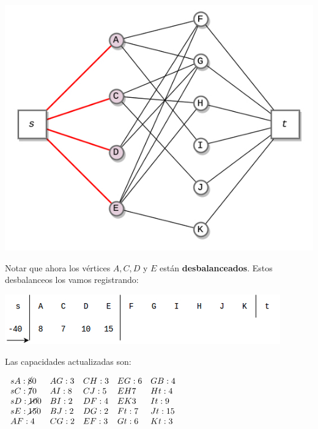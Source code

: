 \documentclass[10pt,a4paper]{article}
\begin{document}
\begin{center}

    \begin{adjustbox}{max size={\textwidth}{\textheight}}
        \includegraphics{definitions/wave_2.jpg}
        \end{adjustbox}
    
\end{center}

Notar que ahora los vértices $A, C, D$ y $E$ están \textbf{desbalanceados}. Estos desbalanceos los vamos registrando:

\begin{center}

    \begin{adjustbox}{max size={\textwidth}{\textheight}}
        \includegraphics{definitions/wave_b2.jpg}
        \end{adjustbox}
    
\end{center}

Las capacidades actualizadas son:

\begin{center}
$\begin{array}{lllll} sA:\cancel{8} 0 & AG: 3 & CH: 3 & EG: 6 & GB:4\\ sC:\cancel{7 } 0 & AI: 8 & CJ: 5 & EH 7 & Ht: 4\\ sD:\cancel{10} 0 & BI: 2 & DF:4 & EK 3 & It: 9\\ sE: \cancel{15} 0 &BJ: 2 & DG: 2 & Ft: 7 & Jt: 15\\ AF: 4 & CG: 2 & EF: 3 & Gt: 6 & Kt: 3\\ \end{array}$
\end{center}
\end{document}
